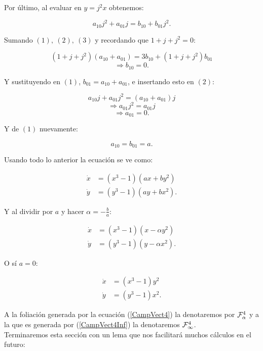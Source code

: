 Por último, al evaluar en $y=j^{2}x$ obtenemos:

\begin{equation}
\tag{3}
a_{10}j^{2} + a_{01}j = b_{10} + b_{01}j^{2}.
\end{equation}

Sumando $(1),\ (2),\ (3)$ y recordando que $1 + j + j^{2} = 0$:

$$(1 + j + j^{2})(a_{10} + a_{01}) = 3b_{10} + (1+j +j^{2})b_{01}$$
$$\Rightarrow b_{10}=0.$$

Y sustituyendo en $(1)$, $b_{01}=a_{10} + a_{01}$, e insertando esto en $(2)$:

$$ a_{10}j + a_{01}j^{2 }= (a_{10} + a_{01})j$$
$$ \Rightarrow a_{01}j^{2} = a_{01}j$$
$$ \Rightarrow a_{01} = 0.$$

Y de $(1)$ nuevamente:

$$a_{10} = b_{01} = a.$$

Usando todo lo anterior la ecuación se ve como:

\begin{align*}
\dot{x} &= (x^{3}-1)(ax + by^{2}) \\
\dot{y} &= (y^{3}-1)(ay + bx^{2}).
\end{align*}

Y al dividir por $a$ y hacer $\alpha = -\frac{b}{a}$:

\begin{equation}
\label{CampVect4}
\begin{aligned}
\dot{x} &= (x^{3}-1)(x - \alpha y^{2}) \\
\dot{y} &= (y^{3}-1)(y - \alpha x^{2}).
\end{aligned}
\end{equation}

O sí $a = 0$:

\begin{equation}
\label{CampVect4Inf}
\begin{aligned}
\dot{x} &= (x^{3}-1)y^{2} \\
\dot{y} &= (y^{3}-1)x^{2}.
\end{aligned}
\end{equation}

A la foliación generada por la ecuación (\ref{CampVect4}) la denotaremos por $\Fol[4]{\alpha}$ y a la que es generada por (\ref{CampVect4Inf}) la denotaremos $\Fol[4]{\infty}$.\\

Terminaremos esta sección con un lema que nos facilitará muchos cálculos en el futuro:

